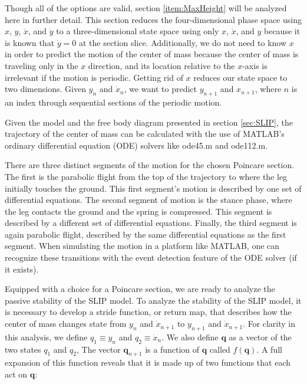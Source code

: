 Though all of the options are valid, section \ref{item:MaxHeight} will be
analyzed here in further detail. This section reduces the four-dimensional
phase space using $x$, $y$, $\dot{x}$, and $\dot{y}$ to a three-dimensional
state space using only $x$, $\dot{x}$, and $y$ because it is known that
$\dot{y} = 0$ at the section slice. Additionally, we do not need to know $x$ in
order to predict the motion of the center of mass because the center of mass is
traveling only in the $x$ direction, and its location relative to the $x$-axis
is irrelevant if the motion is periodic. Getting rid of $x$ reduces our state
space to two dimensions. Given $y_{n}$ and $\dot{x}_{n}$, we want to predict
$y_{n+1}$ and $x_{n+1}$, where $n$ is an index through sequential
sections of the periodic motion.

Given the model and the free body diagram presented in section \ref{sec:SLIP},
the trajectory of the center of mass can be calculated with the use of MATLAB's
ordinary differential equation (ODE) solvers like ode45.m and ode112.m.

There are three distinct segments of the motion for the chosen Poincare
section. The first is the parabolic flight from the top of the trajectory to
where the leg initially touches the ground. This first segment's motion is
described by one set of differential equations. The second segment of motion is
the stance phase, where the leg contacts the ground and the spring is
compressed. This segment is described by a different set of differential
equations. Finally, the third segment is again parabolic flight, described by
the same differential equations as the first segment. When simulating the
motion in a platform like MATLAB, one can recognize these transitions with the
event detection feature of the ODE solver (if it exists).

Equipped with a choice for a Poincare section, we are ready to analyze the
passive stability of the SLIP model. To analyze the stability of the SLIP
model, it is necessary to develop a stride function, or return map, that
describes how the center of mass changes state from $y_{n}$ and $\dot{x}_{n+1}$
to $y_{n+1}$ and $\dot{x}_{n+1}$.  For clarity in this analysis, we define
$q_{1}\equiv y_{n}$ and $q_{2}\equiv\dot{x}_{n}$. We also define $\mathbf{q}$
as a vector of the two states $q_{1}$ and $q_{2}$, The vector
$\mathbf{q}_{n+1}$ is a function of $\mathbf{q}$ called $f(\mathbf{q})$. A full
expansion of this function reveals that it is made up of two functions that
each act on $\mathbf{q}$:

